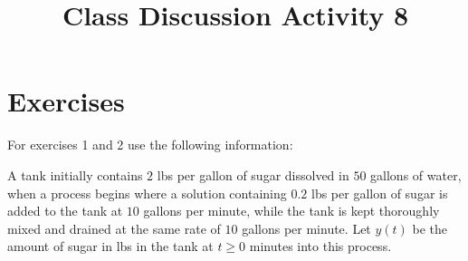 \documentclass{ximera}
\begin{document}
\begin{abstract}
 \end{abstract}

    \title{Class Discussion Activity 8}
    
    \maketitle

\section*{Exercises}

For exercises 1 and 2 use the following information:

A tank initially contains $2$ lbs per gallon of sugar dissolved in $50$ gallons of water, when a process begins where a solution containing $0.2$ lbs per gallon of sugar is added to the tank at $10$ gallons per minute, while the tank is kept thoroughly mixed and drained at the same rate of $10$ gallons per minute.  Let $y(t)$ be the amount of sugar in lbs in the tank at $t\geq 0$ minutes into this process.


\end{document}
